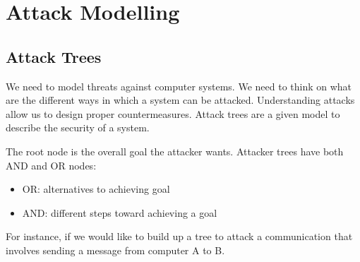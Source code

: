 \section{Attack Modelling}

\subsection{Attack Trees}

We need to model threats against computer systems. We need to think on what are the different ways in which a system can be attacked. Understanding attacks allow us to design proper countermeasures. Attack trees are a given model to describe the security of a system. 

The root node is the overall goal the attacker wants. Attacker trees have both AND and OR nodes:
\begin{itemize}
    \item OR: alternatives to achieving goal
    \item AND: different steps toward achieving a goal
\end{itemize}
For instance, if we would like to build up a tree to attack a communication that involves sending a message from computer A to B. 
